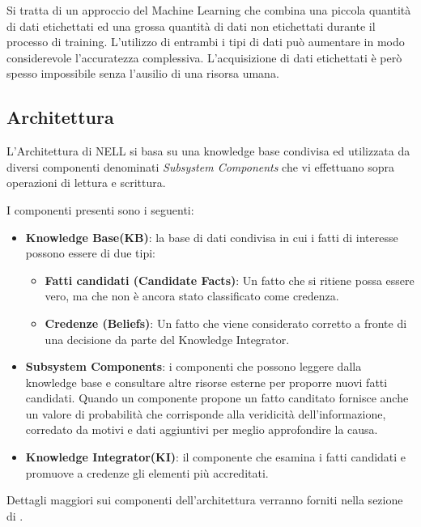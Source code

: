 \begin{info}
	Si tratta di un approccio del Machine Learning che combina una piccola quantità di dati etichettati ed una grossa quantità di dati non etichettati durante il processo di training.
	L'utilizzo di entrambi i tipi di dati può aumentare in modo considerevole l'accuratezza complessiva. L'acquisizione di dati etichettati è però spesso impossibile senza l'ausilio di una risorsa umana.
\end{info}

\subsection{Architettura}
L'Architettura di NELL si basa su una knowledge base condivisa ed utilizzata da diversi componenti denominati \textit{Subsystem Components} che vi effettuano sopra operazioni di lettura e scrittura. 

\noindent I componenti presenti sono i seguenti:
\begin{itemize}
    \item \textbf{Knowledge Base(KB)}: la base di dati condivisa in cui i fatti di interesse possono essere di due tipi:
    \begin{itemize}
        \item \textbf{Fatti candidati (Candidate Facts)}: Un fatto che si ritiene possa essere vero, ma che non è ancora stato classificato come credenza.
        \item \textbf{Credenze (Beliefs)}: Un fatto che viene considerato corretto a fronte di una decisione da parte del Knowledge Integrator.
    \end{itemize}
    \item \textbf{Subsystem Components}: i componenti che possono leggere dalla knowledge base e consultare altre risorse esterne per proporre nuovi fatti candidati.
    Quando un componente propone un fatto canditato fornisce anche un valore di probabilità che corrisponde alla veridicità dell'informazione, corredato da motivi e dati aggiuntivi per meglio approfondire la causa.
    \item \textbf{Knowledge Integrator(KI)}: il componente che esamina i fatti candidati e promuove a credenze gli elementi più accreditati.
\end{itemize}

\noindent Dettagli maggiori sui componenti dell'architettura verranno forniti nella sezione di .


